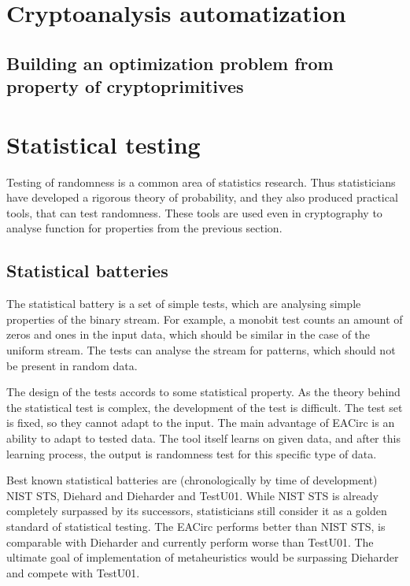\documentclass[
  print, %
  Table,   %
  nolof,     %
  nolot,     %
  11pt, %
  oneside  %
]{fithesis3}
\begin{document}
\section{Cryptoanalysis automatization}



\subsection[Optimization problem for a cryptoprimitive]{Building an optimization problem from property of cryptoprimitives}


\section{Statistical testing}

Testing of randomness is a common area of statistics research. Thus statisticians have developed a rigorous theory of probability, and they also produced practical tools, that can test randomness. These tools are used even in cryptography to analyse function for properties from the previous section.

\subsection{Statistical batteries}

The statistical battery is a set of simple tests, which are analysing simple properties of the binary stream. For example, a monobit test counts an amount of zeros and ones in the input data, which should be similar in the case of the uniform stream. The tests can analyse the stream for patterns, which should not be present in random data.

The design of the tests accords to some statistical property. As the theory behind the statistical test is complex, the development of the test is difficult. The test set is fixed, so they cannot adapt to the input. The main advantage of EACirc is an ability to adapt to tested data. The tool itself learns on given data, and after this learning process, the output is randomness test for this specific type of data.

Best known statistical batteries are (chronologically by time of development) NIST STS, Diehard and Dieharder and TestU01. While NIST STS is already completely surpassed by its successors, statisticians still consider it as a golden standard of statistical testing. The EACirc performs better than NIST STS, is comparable with Dieharder and currently perform worse than TestU01. The ultimate goal of implementation of metaheuristics would be surpassing Dieharder and compete with TestU01.
\end{document}
